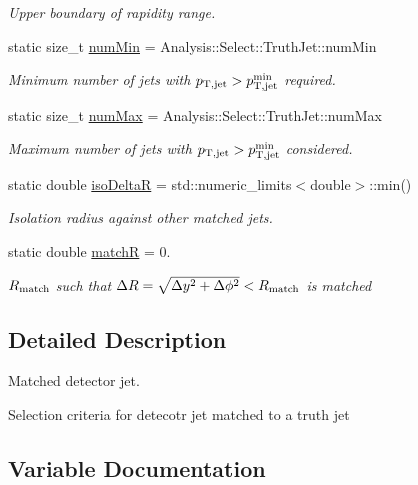 \begin{DoxyCompactItemize}
\begin{DoxyCompactList}\small\item\em Upper boundary of rapidity range. \end{DoxyCompactList}\item 
static size\+\_\+t \hyperlink{namespaceAnalysis_1_1Select_1_1MatchedJet_a528450e4a45949ec4d94d15cfaef73ce}{num\+Min} = Analysis\+::\+Select\+::\+Truth\+Jet\+::num\+Min
\begin{DoxyCompactList}\small\item\em Minimum number of jets with $ p_{\rm T,jet} > p_{\rm T,jet}^{\rm min} $ required. \end{DoxyCompactList}\item 
static size\+\_\+t \hyperlink{namespaceAnalysis_1_1Select_1_1MatchedJet_afc778d9fb3fb78bc47fe0d1cabbde8ad}{num\+Max} = Analysis\+::\+Select\+::\+Truth\+Jet\+::num\+Max
\begin{DoxyCompactList}\small\item\em Maximum number of jets with $ p_{\rm T,jet} > p_{\rm T,jet}^{\rm min} $ considered. \end{DoxyCompactList}\item 
static double \hyperlink{namespaceAnalysis_1_1Select_1_1MatchedJet_a1fd4c19e756cb09ffce16b4e28f29b1e}{iso\+DeltaR} = std\+::numeric\+\_\+limits$<$double$>$\+::min()
\begin{DoxyCompactList}\small\item\em Isolation radius against other matched jets. \end{DoxyCompactList}\item 
static double \hyperlink{namespaceAnalysis_1_1Select_1_1MatchedJet_ad59f2cab2bdc032b32b4ce0321ecfbb1}{matchR} = 0.
\begin{DoxyCompactList}\small\item\em $ R_{\rm match} $ such that $ \Delta R = \sqrt{\Delta y^{2}+\Delta\phi^{2}} < R_{\rm match} $ is matched \end{DoxyCompactList}\end{DoxyCompactItemize}


\subsection{Detailed Description}
Matched detector jet. 

Selection criteria for detecotr jet matched to a truth jet 

\subsection{Variable Documentation}
